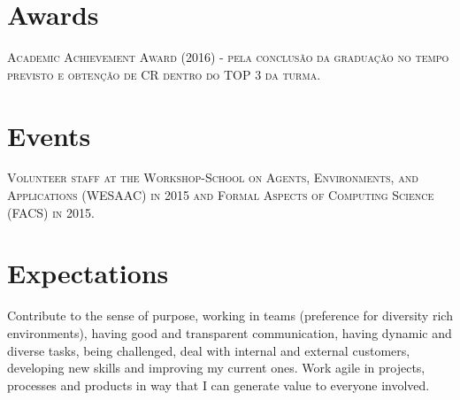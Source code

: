 \documentclass[a4paper,10pt]{article}
\begin{document}
\section {Awards}
\textsc{Academic Achievement Award (2016) - pela conclusão da graduação no tempo previsto e obtenção de CR dentro do TOP 3 da turma.}

\section {Events}
\textsc{Volunteer staff at the Workshop-School on Agents, Environments, and Applications (WESAAC) in 2015 and Formal Aspects of Computing Science (FACS) in 2015.}

\section {Expectations}
Contribute to the sense of purpose, working in teams (preference for diversity rich environments), having good and transparent communication, having dynamic and diverse tasks, being challenged, deal with internal and external customers, developing new skills and improving my current ones. Work agile in projects, processes and products in way that I can generate value to everyone involved.   
\end{document}
